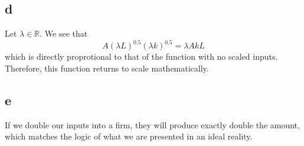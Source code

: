 \documentclass[12pt]{article}
\begin{document}
\subsection*{d}
Let $\lambda \in \mathbb{R}$. We see that 
\[
A(\lambda L)^{0.5}(\lambda k)^{0.5} = \lambda A k L 
\]
which is directly proprotional to that of the function with no scaled inputs. Therefore, this function returns to scale mathematically. 
\subsection*{e}
If we double our inputs into a firm, they will produce exactly double the amount, which matches the logic of what we are presented in an ideal reality. 
\end{document}
